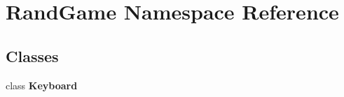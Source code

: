 \hypertarget{namespace_rand_game}{}\section{Rand\+Game Namespace Reference}
\label{namespace_rand_game}
\subsection*{Classes}
\begin{DoxyCompactItemize}
\item 
class {\bfseries Keyboard}
\end{DoxyCompactItemize}
